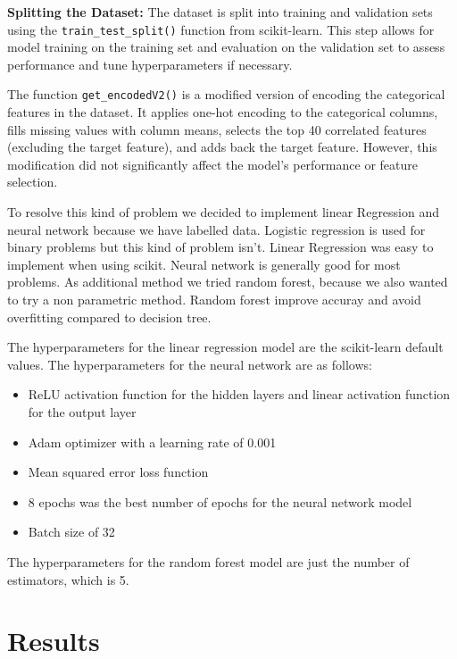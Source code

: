 \documentclass[a4, 10 pt, conference]{ieeeconf}  %
\begin{document}
\textbf{Splitting the Dataset:} The dataset is split into training and validation sets using the \texttt{train\_test\_split()} function from scikit-learn. This step allows for model training on the training set and evaluation on the validation set to assess performance and tune hyperparameters if necessary.

The function \texttt{get\_encodedV2()} is a modified version of encoding the categorical features in the dataset. It applies one-hot encoding to the categorical columns, fills missing values with column means, selects the top 40 correlated features (excluding the target feature), and adds back the target feature. However, this modification did not significantly affect the model's performance or feature selection.

To resolve this kind of problem we decided to implement linear Regression and neural network because we have labelled data. Logistic regression is used for binary problems but this kind of problem isn't. Linear Regression was easy to implement when using scikit. Neural network is generally good for most problems. 
As additional method we tried random forest, because we also wanted to try a non parametric method. Random forest improve accuray and avoid overfitting compared to decision tree. 

The hyperparameters for the linear regression model are the scikit-learn default values. The hyperparameters for the neural network are as follows:
\begin{itemize}
  2 hidden layers with 64 neurons for the first layer and 32 neurons for the second layer
  \item ReLU activation function for the hidden layers and linear activation function for the output layer
  \item Adam optimizer with a learning rate of 0.001
  \item Mean squared error loss function
  \item 8 epochs was the best number of epochs for the neural network model
  \item Batch size of 32
\end{itemize}

The hyperparameters for the random forest model are just the number of estimators, which is 5.

\section{Results}
\label{sec:results}
\end{document}

